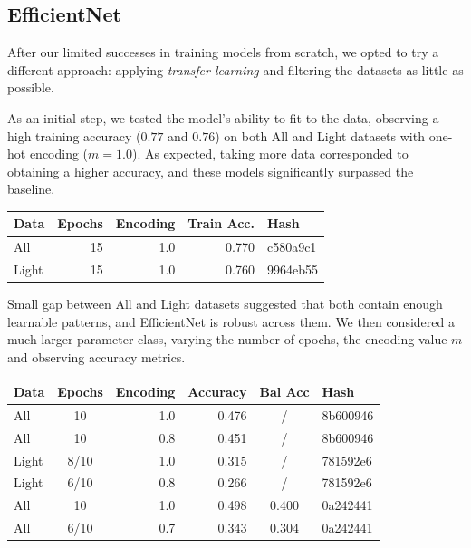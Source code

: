 \documentclass[10pt]{article}
\begin{document}
\subsection*{EfficientNet}

After our limited successes in training models from scratch, we opted to try a different approach: applying \emph{transfer learning} and filtering the datasets as little as possible.

As an initial step, we tested the model's ability to fit to the data, observing a high training accuracy ($0.77$ and $0.76$) on both All and Light datasets with one-hot encoding ($m=1.0$). As expected, taking more data corresponded to obtaining a higher accuracy, and these models significantly surpassed the baseline.

\begin{table}[h!]
  \centering
  \begin{tabular}{|l|r|r|r|l|}
    \hline
    Data  & Epochs & Encoding & Train Acc. & Hash     \\
    \hline
    All    & 15     & 1.0      & 0.770     & c580a9c1 \\
    Light  & 15     & 1.0      & 0.760     & 9964eb55 \\
    \hline
  \end{tabular}
  \label{tab:train_results}
\end{table}

Small gap between All and Light datasets suggested that both contain enough learnable patterns, and EfficientNet is robust across them. We then considered a much larger parameter class, varying the number of epochs, the encoding value $m$ and observing accuracy metrics.

\begin{table}[h!]
  \centering
  \begin{tabular}{|l|c|r|r|c|l|}
    \hline
    Data  & Epochs & Encoding & Accuracy & Bal Acc & Hash     \\
    \hline
    All   & 10     & 1.0      & 0.476    & /       & 8b600946 \\
    All   & 10     & 0.8      & 0.451    & /       & 8b600946 \\
    Light & 8/10   & 1.0      & 0.315    & /       & 781592e6 \\
    Light & 6/10   & 0.8      & 0.266    & /       & 781592e6 \\
    All   & 10     & 1.0      & 0.498    & 0.400   & 0a242441 \\
    All   & 6/10   & 0.7      & 0.343    & 0.304   & 0a242441 \\
    \hline
  \end{tabular}
  \label{tab:balanced_accuracy}
\end{table}
\end{document}
